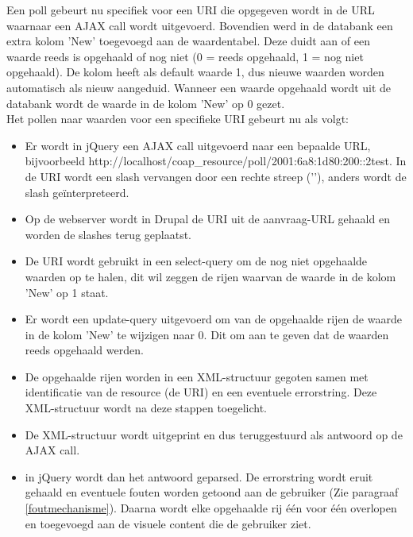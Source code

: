Een poll gebeurt nu specifiek voor een URI die opgegeven wordt in de URL waarnaar een AJAX call wordt uitgevoerd. Bovendien werd in de databank een extra kolom 'New' toegevoegd aan de waardentabel. Deze duidt aan of een waarde reeds is opgehaald of nog niet (0 = reeds opgehaald, 1 = nog niet opgehaald). De kolom heeft als default waarde 1, dus nieuwe waarden worden automatisch als nieuw aangeduid. Wanneer een waarde opgehaald wordt uit de databank wordt de waarde in de kolom 'New' op 0 gezet.\\
Het pollen naar waarden voor een specifieke URI gebeurt nu als volgt:
\begin{itemize}
\item Er wordt in jQuery een AJAX call uitgevoerd naar een bepaalde URL, bijvoorbeeld http://localhost/coap\_resource/poll/2001:6a8:1d80:200::2\textbar test. In de URI wordt een slash vervangen door een rechte streep ('\textbar'), anders wordt de slash ge\"{i}nterpreteerd.
\item Op de webserver wordt in Drupal de URI uit de aanvraag-URL gehaald en worden de slashes terug geplaatst.
\item De URI wordt gebruikt in een select-query om de nog niet opgehaalde waarden op te halen, dit wil zeggen de rijen waarvan de waarde in de kolom 'New' op 1 staat.
\item Er wordt een update-query uitgevoerd om van de opgehaalde rijen de waarde in de kolom 'New' te wijzigen naar 0. Dit om aan te geven dat de waarden reeds opgehaald werden.
\item De opgehaalde rijen worden in een XML-structuur gegoten samen met identificatie van de resource (de URI) en een eventuele errorstring. Deze XML-structuur wordt na deze stappen toegelicht.
\item De XML-structuur wordt uitgeprint en dus teruggestuurd als antwoord op de AJAX call.
\item in jQuery wordt dan het antwoord geparsed. De errorstring wordt eruit gehaald en eventuele fouten worden getoond aan de gebruiker (Zie paragraaf \ref{foutmechanisme}). Daarna wordt elke opgehaalde rij \'{e}\'{e}n voor \'{e}\'{e}n overlopen en toegevoegd aan de visuele content die de gebruiker ziet.
\end{itemize}

